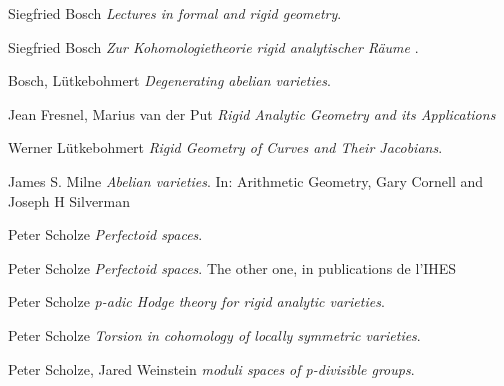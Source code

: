\documentclass[10pt,oneside]{amsart}
\theoremstyle{definition}
\theoremstyle{remark}
\begin{document}
	
	\begin{thebibliography}{9}
		
		Siegfried Bosch
		\textit{Lectures in formal and rigid geometry}.
		
		Siegfried Bosch
		\textit{Zur Kohomologietheorie rigid analytischer R\"aume }.
		
		Bosch, L\"utkebohmert
		\textit{Degenerating abelian varieties}.
		
		Jean Fresnel, Marius van der Put
		\textit{Rigid Analytic Geometry and its Applications}
		
		Werner L\"utkebohmert
		\textit{Rigid Geometry of Curves and Their Jacobians}. 
		
		James S. Milne
		\textit{Abelian varieties}.
		In: Arithmetic Geometry, Gary Cornell and Joseph H Silverman
			
		Peter Scholze
		\textit{Perfectoid spaces}. 
		
		Peter Scholze
		\textit{Perfectoid spaces}. The other one, in publications de l'IHES 
		
		Peter Scholze
		\textit{p-adic Hodge theory for rigid analytic varieties}.
		
		Peter Scholze
		\textit{Torsion in cohomology of locally symmetric varieties}.
		
		Peter Scholze, Jared Weinstein
		\textit{moduli spaces of p-divisible groups}.
		
		
		
	\end{thebibliography}
	
	
	
	
	
	
	
	
	
	
	
	
	
	
\end{document}
